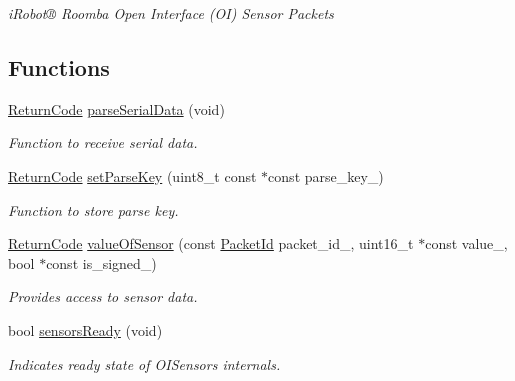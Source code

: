 \begin{DoxyCompactItemize}
\begin{DoxyCompactList}\small\item\em i\+Robot® Roomba Open Interface (O\+I) Sensor Packets \end{DoxyCompactList}\end{DoxyCompactItemize}
\subsection*{Functions}
\begin{DoxyCompactItemize}
\item 
\hyperlink{namespaceroomba_1_1series500_1_1oi_1_1sensors_afedb9083158162092444b523e0a32ebb}{Return\+Code} \hyperlink{namespaceroomba_1_1series500_1_1oi_1_1sensors_a55e703cd451e199cd600a41230239de7}{parse\+Serial\+Data} (void)
\begin{DoxyCompactList}\small\item\em Function to receive serial data. \end{DoxyCompactList}\item 
\hyperlink{namespaceroomba_1_1series500_1_1oi_1_1sensors_afedb9083158162092444b523e0a32ebb}{Return\+Code} \hyperlink{namespaceroomba_1_1series500_1_1oi_1_1sensors_aad9d5021c285d0aa1382be994ccdc841}{set\+Parse\+Key} (uint8\+\_\+t const $\ast$const parse\+\_\+key\+\_\+)
\begin{DoxyCompactList}\small\item\em Function to store parse key. \end{DoxyCompactList}\item 
\hyperlink{namespaceroomba_1_1series500_1_1oi_1_1sensors_afedb9083158162092444b523e0a32ebb}{Return\+Code} \hyperlink{namespaceroomba_1_1series500_1_1oi_1_1sensors_a670e21671d8c2923a3fbac6e7ebc28eb}{value\+Of\+Sensor} (const \hyperlink{namespaceroomba_1_1series500_1_1oi_1_1sensors_a909f47d40452d1cabb85eef642ac04b6}{Packet\+Id} packet\+\_\+id\+\_\+, uint16\+\_\+t $\ast$const value\+\_\+, bool $\ast$const is\+\_\+signed\+\_\+)
\begin{DoxyCompactList}\small\item\em Provides access to sensor data. \end{DoxyCompactList}\item 
bool \hyperlink{namespaceroomba_1_1series500_1_1oi_1_1sensors_a0a74efce16d762ee40f45bf26d128b66}{sensors\+Ready} (void)
\begin{DoxyCompactList}\small\item\em Indicates ready state of O\+I\+Sensors internals. \end{DoxyCompactList}\end{DoxyCompactItemize}


